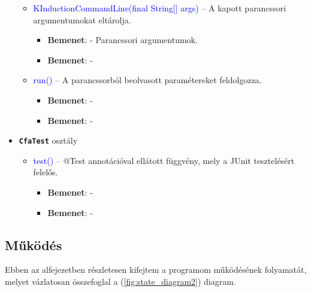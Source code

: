 \begin{itemize}
\begin{itemize}
		\item \textcolor{blue}{KInductionCommandLine(final String[] args)} -- A kapott parancssori argumentumokat eltárolja.
		\begin{itemize}
			\item \textbf{Bemenet}: - Parancssori argumentumok.
			\item \textbf{Bemenet}: -
		\end{itemize}
		
		\item \textcolor{blue}{run()} -- A parancssorból beolvasott paramétereket feldolgozza.
		\begin{itemize}
			\item \textbf{Bemenet}: -
			\item \textbf{Bemenet}: -
		\end{itemize}
	\end{itemize}

	\item \textbf{\texttt{CfaTest}} osztály
	\begin{itemize}
		\item \textcolor{blue}{test()} -- @Test annotációval ellátott függvény, mely a JUnit tesztelésért felelős.
		\begin{itemize}
			\item \textbf{Bemenet}: -
			\item \textbf{Bemenet}: -
		\end{itemize}
	\end{itemize}
\end{itemize}

\subsection{Működés}
Ebben az alfejezetben részletesen kifejtem a programom működésének folyamatát, melyet vázlatosan összefoglal a (\ref{fig:state_diagram2}) diagram.

